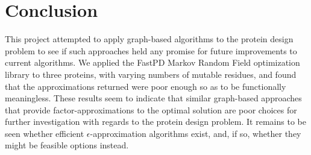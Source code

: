 \documentclass[11pt]{article}
\begin{document}
	\section{Conclusion}
	This project attempted to apply graph-based algorithms to the protein design
	problem to see if such approaches held any promise for future improvements
	to current algorithms. We applied the FastPD Markov Random Field optimization
	library to three proteins, with varying numbers of mutable residues, and found
	that the approximations returned were poor enough so as to be functionally
	meaningless. These results seem to indicate that similar graph-based approaches
	that provide factor-approximations to the optimal solution are poor choices for
	further investigation with regards to the protein design problem. It remains
	to be seen whether efficient $\epsilon$-approximation algorithms exist, and,
	if so, whether they might be feasible options instead. 
	
\end{document}
